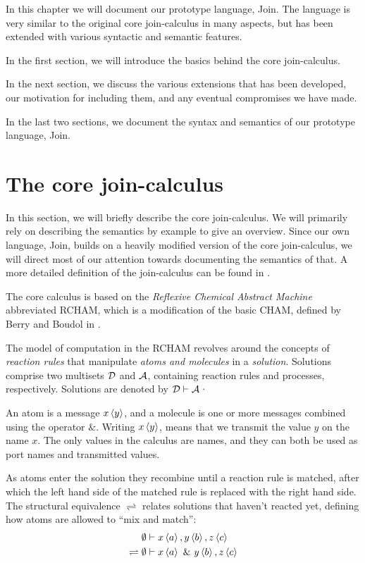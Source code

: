 
In this chapter we will document our prototype language, Join.  The
language is very similar to the original core join-calculus in many
aspects, but has been extended with various syntactic and semantic
features.

In the first section, we will introduce the basics behind the core
join-calculus.

In the next section, we discuss the various extensions that has been
developed, our motivation for including them, and any eventual compromises we
have made.

In the last two sections, we document the syntax and semantics of our prototype
language, Join.

\section{The core join-calculus}

In this section, we will briefly describe the core join-calculus. We will
primarily rely on describing the semantics by example to give an overview.
Since our own language, Join, builds on a heavily modified version of the core
join-calculus, we will direct most of our attention towards documenting the
semantics of that. A more detailed definition of the join-calculus can be found
in \cite{fournet1996reflexive}.

The core calculus is based on the \emph{Reflexive Chemical Abstract Machine}
abbreviated RCHAM, which is a modification of the basic CHAM, defined by Berry
and Boudol in \cite{berry1989chemical}.

The model of computation in the RCHAM revolves around the concepts of
\emph{reaction rules} that manipulate \emph{atoms and molecules} in a
\emph{solution}. Solutions comprise two multisets $\mathcal{D}$ and $\mathcal{A}$, containing
reaction rules and processes, respectively. Solutions are denoted by $\mathcal{D} \vdash
\mathcal{A}$·

An atom is a message $\atm x<y>$, and a molecule is one or more
messages combined using the operator $\&$. Writing $\atm x<y>$, means that we
transmit the value $y$ on the name $x$. The only values in the calculus are
names, and they can both be used as port names and transmitted values.

As atoms enter the solution they recombine until a reaction rule is matched,
after which the left hand side of the matched rule is replaced with the right
hand side. The structural equivalence $\rightleftharpoons$ relates solutions
that haven't reacted yet, defining how atoms are allowed to ``mix and match'':
\begin{align*}
                  & \emptyset \vdash \atm x<a>, \atm y<b>, \atm z<c> \\
\rightleftharpoons{}& \emptyset \vdash \atm x<a> ~\& ~\atm y<b>, \atm z<c>
\end{align*}


